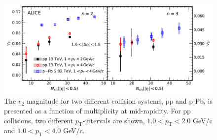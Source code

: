 \begin{figure}[h!]
	\centering
\includegraphics[width=1.0\textwidth]{figures/Fig6_v2Mult_allSystems_Data.pdf} 
	\caption{The $v_2$ magnitude for two different collision systems, pp and p-Pb, is presented as a function of multiplicity at mid-rapidity. For pp collisions, two different $p_\mathrm{T}$-intervals are shown, $1.0<p_\mathrm{T}<2.0$ GeV/c and $1.0<p_\mathrm{T}<4.0$ GeV/c.} 
	\label{fig:v2mult}
\end{figure}

